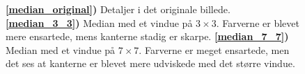 {\begin{figure}[!h]
    \centering
    \hspace{1em}
    \hspace{1em}
    \caption[]{
        \textbf{\ref{median_original})} Detaljer i det originale billede.
        \textbf{\ref{median_3_3})} Median med et vindue på $3\times{}3$.
        Farverne er blevet mere ensartede, mens kanterne stadig er
        skarpe.
        \textbf{\ref{median_7_7})} Median med et vindue på $7\times{}7$.
        Farverne er meget ensartede, men det ses at kanterne er blevet
        mere udviskede med det større vindue.
    }
    \label{median_metode}
\end{figure}
}

